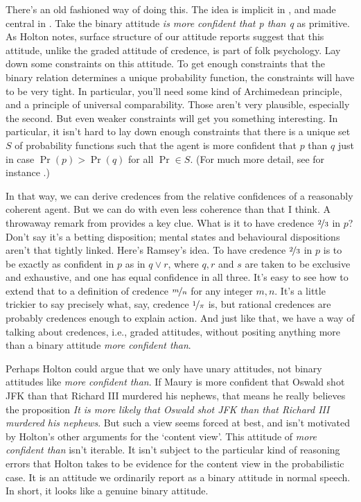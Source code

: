 There's an old fashioned way of doing this. The idea is implicit in \citet{RamseyTruthProb}, and made central in \citet{DeFinetti1964}. Take the binary attitude \textit{is more confident that p than q} as primitive. As Holton notes, surface structure of our attitude reports suggest that this attitude, unlike the graded attitude of credence, is part of folk psychology. Lay down some constraints on this attitude. To get enough constraints that the binary relation determines a unique probability function, the constraints will have to be very tight. In particular, you'll need some kind of Archimedean principle, and a principle of universal comparability. Those aren't very plausible, especially the second. But even weaker constraints will get you something interesting. In particular, it isn't hard to lay down enough constraints that there is a unique set $S$ of probability functions such that the agent is more confident that $p$ than $q$ just in case $\Pr( p) > \Pr(q)$ for all $\Pr \in S$. (For much more detail, see for instance \citet{Walley1991}.) 

In that way, we can derive credences from the relative confidences of a reasonably coherent agent. But we can do with even less coherence than that I think. A throwaway remark from \citet{Ramsey1929} provides a key clue. What is it to have credence $\nicefrac{2}{3}$ in $p$? Don't say it's a betting disposition; mental states and behavioural dispositions aren't that tightly linked. Here's Ramsey's idea. To have credence $\nicefrac{2}{3}$ in $p$ is to be exactly as confident in $p$ as in $q \vee r$, where $q, r$ and $s$ are taken to be exclusive and exhaustive, and one has equal confidence in all three. It's easy to see how to extend that to a definition of credence $\nicefrac{m}{n}$ for any integer $m, n$. It's a little trickier to say precisely what, say, credence $\nicefrac{1}{\pi}$ is, but rational credences are probably credences enough to explain action. And just like that, we have a way of talking about credences, i.e., graded attitudes, without positing anything more than a binary attitude \textit{more confident than}.

Perhaps Holton could argue that we only have unary attitudes, not binary attitudes like \textit{more confident than}. If Maury is more confident that Oswald shot JFK than that Richard III murdered his nephews, that means he really believes the proposition \textit{It is more likely that Oswald shot JFK than that Richard III murdered his nephews}. But such a view seems forced at best, and isn't motivated by Holton's other arguments for the `content view'. This attitude of \textit{more confident than} isn't iterable. It isn't subject to the particular kind of reasoning errors that Holton takes to be evidence for the content view in the probabilistic case. It is an attitude we ordinarily report as a binary attitude in normal speech. In short, it looks like a genuine binary attitude.

